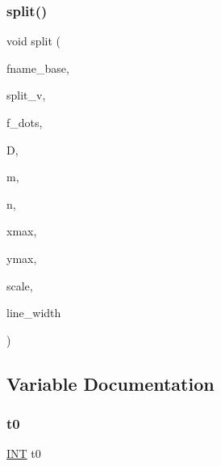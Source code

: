 \subsubsection{\texorpdfstring{split()}{split()}}
{\footnotesize\ttfamily void split (\begin{DoxyParamCaption}\item[{const \mbox{\hyperlink{galois_8h_ab6cc7b4aeb6ea31aba2b3fbfc83ff5e6}{B\+Y\+TE}} $\ast$}]{fname\+\_\+base,  }\item[{\mbox{\hyperlink{galois_8h_a09fddde158a3a20bd2dcadb609de11dc}{I\+NT}}}]{split\+\_\+v,  }\item[{\mbox{\hyperlink{galois_8h_a09fddde158a3a20bd2dcadb609de11dc}{I\+NT}}}]{f\+\_\+dots,  }\item[{\mbox{\hyperlink{galois_8h_a122c4acf389c050379f00341fdcd5812}{U\+B\+Y\+TE}} $\ast$}]{D,  }\item[{\mbox{\hyperlink{galois_8h_a09fddde158a3a20bd2dcadb609de11dc}{I\+NT}}}]{m,  }\item[{\mbox{\hyperlink{galois_8h_a09fddde158a3a20bd2dcadb609de11dc}{I\+NT}}}]{n,  }\item[{\mbox{\hyperlink{galois_8h_a09fddde158a3a20bd2dcadb609de11dc}{I\+NT}}}]{xmax,  }\item[{\mbox{\hyperlink{galois_8h_a09fddde158a3a20bd2dcadb609de11dc}{I\+NT}}}]{ymax,  }\item[{double}]{scale,  }\item[{double}]{line\+\_\+width }\end{DoxyParamCaption})}



\subsection{Variable Documentation}
\mbox{\label{plot__decomposition__matrix_8_c_a4268f4fe222ffb119218a0199f5e1904}} 
\subsubsection{\texorpdfstring{t0}{t0}}
{\footnotesize\ttfamily \mbox{\hyperlink{galois_8h_a09fddde158a3a20bd2dcadb609de11dc}{I\+NT}} t0}

